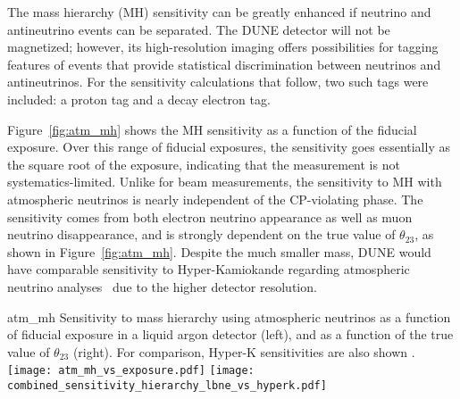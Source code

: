 The mass hierarchy (MH) sensitivity can be greatly enhanced if neutrino and antineutrino events can be 
separated. The DUNE detector will not be magnetized; however, its high-resolution 
imaging offers possibilities for tagging features of events that provide statistical 
discrimination between neutrinos and antineutrinos. For the sensitivity calculations 
that follow, two such tags were included: a proton tag and a decay electron tag. 


Figure~\ref{fig:atm_mh} shows the MH sensitivity as a function of the fiducial exposure. 
Over this range of fiducial exposures, the sensitivity goes essentially as the square 
root of the exposure, indicating that the measurement is not systematics-limited. 
Unlike for beam measurements, the sensitivity to MH with atmospheric neutrinos is 
nearly independent of the CP-violating phase.  The sensitivity comes from both 
electron neutrino appearance as well as muon neutrino disappearance, and is strongly 
dependent on the true value of $\theta_{23}$, as shown in Figure~\ref{fig:atm_mh}.  Despite the
much smaller mass, DUNE would have comparable sensitivity to Hyper-Kamiokande regarding atmospheric 
neutrino analyses~\cite{Kearns:2013lea} due to the higher detector resolution.    

\begin{cdrfigure}{atm_mh}
{Sensitivity to mass hierarchy using atmospheric neutrinos as a function of fiducial 
exposure in a liquid argon detector (left), and as a function of the true value of 
$\theta_{23}$ (right).  For comparison, Hyper-K sensitivities are also shown \cite{Kearns:2013lea}.}  
\texttt{[image: atm\_mh\_vs\_exposure.pdf]}
\texttt{[image: combined\_sensitivity\_hierarchy\_lbne\_vs\_hyperk.pdf]}
\end{cdrfigure}

